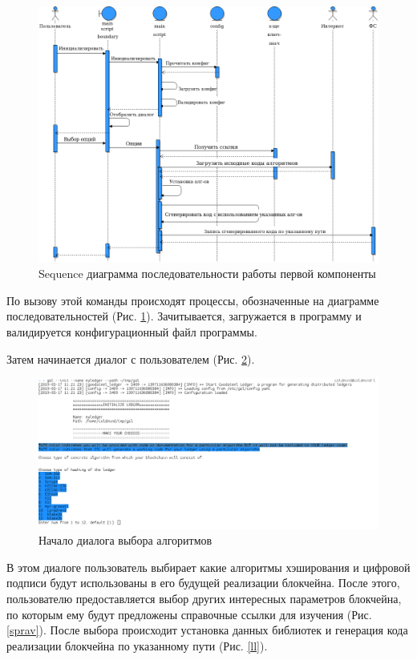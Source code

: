 \begin{figure}[h]
    \centering
    \includegraphics[width=\textwidth]{images/sequence}
    \caption{Sequence диаграмма последовательности работы первой компоненты}\label{sequence}
\end{figure}

\newpage
По вызову этой команды происходят процессы, обозначенные на диаграмме
последовательностей (Рис.  \ref{sequence}). Зачитывается, загружается в
программу и валидируется конфигурационный файл программы.

\newpage

Затем начинается диалог с пользователем (Рис. \ref{dialog}).
\begin{figure}
    \centering
    \includegraphics[width=\textwidth]{images/dialog_start}
    \caption{Начало диалога выбора алгоритмов}\label{dialog}
\end{figure}

В этом диалоге пользователь выбирает какие алгоритмы хэширования и цифровой
подписи будут использованы в его будущей реализации блокчейна. После этого,
пользователю предоставляется выбор других интересных параметров блокчейна, по
которым ему будут предложены справочные ссылки для изучения (Рис. \ref{sprav}).
После выбора происходит установка данных библиотек и генерация кода реализации
блокчейна по указанному пути (Рис. \ref{ll}).

